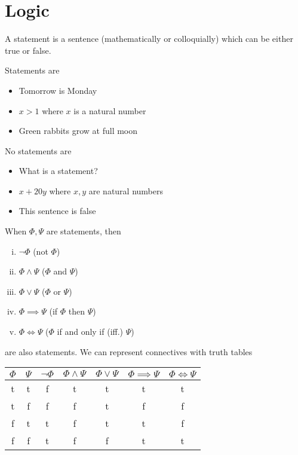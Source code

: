 \documentclass[../../script.tex]{subfiles}
\begin{document}
\section{Logic}
\begin{defi}[Statements]
A statement is a sentence (mathematically or colloquially) which can be either true or false.
\end{defi}

\begin{eg}
Statements are
\begin{itemize}
	\item Tomorrow is Monday
	\item $x > 1$ where $x$ is a natural number
	\item Green rabbits grow at full moon
\end{itemize}
No statements are
\begin{itemize}
	\item What is a statement?
	\item $x + 20y$ where $x, y$ are natural numbers
	\item This sentence is false
\end{itemize}
\end{eg}

\begin{defi}[Connectives]
When $\Phi, \Psi$ are statements, then
\begin{enumerate}[(i)]
	\item $\neg\Phi$ (not $\Phi$)
	\item $\Phi \wedge \Psi$ ($\Phi$ and $\Psi$)
	\item $\Phi \vee \Psi$ ($\Phi$ or $\Psi$)
	\item $\Phi \implies \Psi$ (if $\Phi$ then $\Psi$)
	\item $\Phi \iff \Psi$ ($\Phi$ if and only if (iff.) $\Psi$)
\end{enumerate}
are also statements. We can represent connectives with truth tables
\begin{center}
\begin{tabular}{ c|c||c|c|c|c|c }
 $\Phi$ & $\Psi$ & $\neg\Phi$ & $\Phi \wedge \Psi$ & $\Phi \vee \Psi$ & $\Phi \implies \Psi$ & $\Phi \iff \Psi$ \\
 \hline
 t & t & f & t & t & t & t\\
 t & f & f & f & t & f & f\\
 f & t & t & f & t & t & f\\
 f & f & t & f & f & t & t\\
\end{tabular}
\end{center}
\end{defi}
\end{document}
